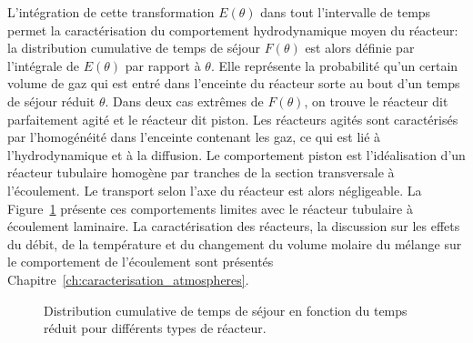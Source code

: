 L'intégration de cette transformation $E(\theta)$ dans tout l'intervalle de temps permet la caractérisation du comportement hydrodynamique moyen du réacteur: la distribution cumulative de temps de séjour $F(\theta)$ est alors définie par l'intégrale de $E(\theta)$ par rapport à $\theta$. Elle représente la probabilité qu'un certain volume de gaz qui est entré dans l'enceinte du réacteur sorte au bout d'un temps de séjour réduit $\theta$. Dans deux cas extrêmes de $F(\theta)$, on trouve le réacteur dit parfaitement agité et le réacteur dit piston. Les réacteurs agités sont caractérisés par l'homogénéité dans l'enceinte contenant les gaz, ce qui est lié à l'hydrodynamique et à la diffusion. Le comportement piston est l'idéalisation d'un réacteur tubulaire homogène par tranches de la section transversale à l'écoulement. Le transport selon l'axe du réacteur est alors négligeable. La Figure~\ref{fig:types_de_reacteur} présente ces comportements limites avec le réacteur tubulaire à écoulement laminaire. La caractérisation des réacteurs, la discussion sur les effets du débit, de la température et du changement du volume molaire du mélange sur le comportement de l'écoulement sont présentés Chapitre~\ref{ch:caracterisation_atmospheres}.

\begin{figure}[h]
  \centering{}
  
  \caption{\label{fig:types_de_reacteur}Distribution cumulative de temps de
    séjour en fonction du temps réduit pour différents types de réacteur.}
\end{figure}

